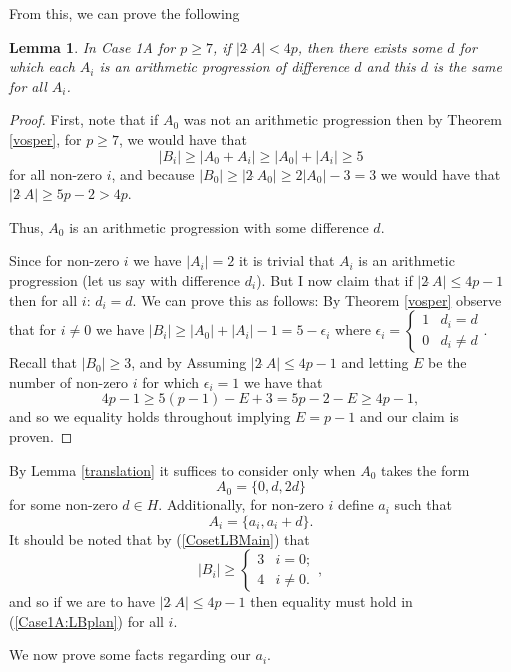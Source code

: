 \documentclass[a4paper, 12pt]{article}\usepackage[english]{babel}
\newtheorem{lem}[thm]{Lemma}
\newcommand{\<}{\langle}
\begin{document}
From this, we can prove the following

\begin{lem}\label{Case1A:arith}
    In Case 1A for $p\geq 7$, if $|2\hat{\;}A|<4p$, then there exists some $d$ for which each $A_i$ is an arithmetic progression of difference $d$ and this $d$ is the same for all $A_i$.
\end{lem}
\begin{proof}
    First, note that if $A_0$ was not an arithmetic progression then by Theorem \ref{vosper}, for $p\geq 7$, we would have that \[|B_i|\geq |A_0+A_i|\geq |A_0|+|A_i|\geq 5\] for all non-zero $i$, and because $|B_0|\geq |2\hat{\;}A_0|\geq 2|A_0|-3=3$ we would have that $|2\hat{\;}A|\geq 5p-2> 4p$. 

    Thus, $A_0$ is an arithmetic progression with some difference $d$.

    Since for non-zero $i$ we have $|A_i|=2$ it is trivial that $A_i$ is an arithmetic progression (let us say with difference $d_i$). But I now claim that if $|2\hat{\;}A|\leq 4p-1$ then for all $i$: $d_i=d$. We can prove this as follows: By Theorem \ref{vosper} observe that for $i\neq 0$ we have  $|B_i|\geq |A_0|+|A_i|-1=5-\epsilon_i$ where $\epsilon_i=\begin{cases}
        1 & d_i=d\\ 0 & d_i\neq d
        
    \end{cases}$. Recall that $|B_0|\geq 3$, and by Assuming $|2\hat{\;}A|\leq 4p-1$ and letting $E$ be the number of non-zero $i$ for which $\epsilon_i=1$ we have that
    \[4p-1\geq 5(p-1)-E+3=5p-2-E\geq 4p-1,\] and so we equality holds throughout implying $E=p-1$ and our claim is proven.
\end{proof}

By Lemma \ref{translation} it suffices to consider only when $A_0$ takes the form \[A_0=\{0,d,2d\}\] for some non-zero $d\in H$. Additionally, for non-zero $i$ define $a_i$ such that \[A_i=\{a_i,a_i+d\}.\] It should be noted that by (\ref{CosetLBMain}) that \begin{equation}\label{Case1A:LBplan}
    |B_i|\geq\begin{cases}
    3 & i=0;\\ 4 & i\neq 0.
\end{cases},
\end{equation}  and so if we are to have $|2\hat{\;}A|\leq 4p-1$ then equality must hold in (\ref{Case1A:LBplan}) for all $i$.

We now prove some facts regarding our $a_i$.
\end{document}
